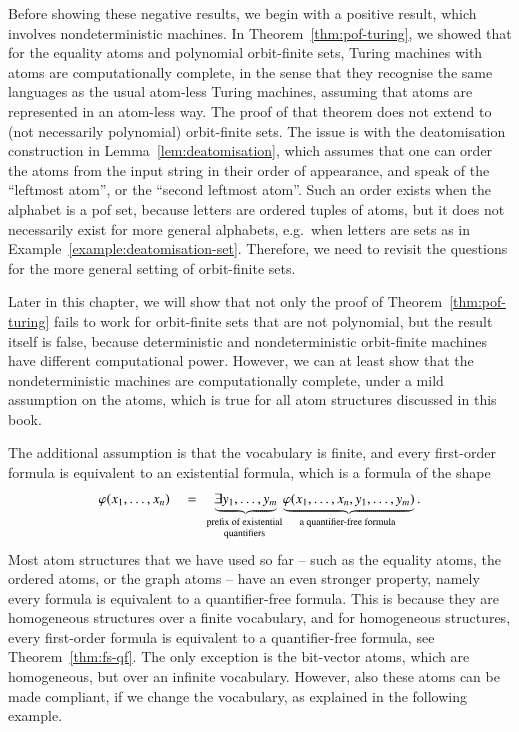Before showing these negative results, we begin with a positive result, which involves nondeterministic machines. In Theorem~\ref{thm:pof-turing}, we showed that for the equality atoms and polynomial orbit-finite sets,  Turing machines with atoms are computationally complete, in the sense that they recognise the same languages as the usual atom-less Turing machines, assuming that atoms are represented in an atom-less way.  
The proof of that theorem  does not extend  to (not necessarily polynomial) orbit-finite sets. The issue is with the deatomisation construction in Lemma~\ref{lem:deatomisation}, which assumes that one can order the atoms from the input string in their order of appearance, and speak of the ``leftmost atom'', or the ``second leftmost atom''. Such an order exists when the alphabet is a pof set, because letters are ordered tuples of atoms, but it does not necessarily exist for more general alphabets,  e.g.~when letters are sets as in Example~\ref{example:deatomisation-set}. 
Therefore, we need to revisit the  questions for the more general setting of orbit-finite sets. 

Later in this chapter, we will show that not only the proof of Theorem~\ref{thm:pof-turing} fails to work for orbit-finite sets that are not polynomial, but the result itself is false, because deterministic and nondeterministic orbit-finite machines have different computational power. However, we can at least show that the nondeterministic machines are computationally complete, under a mild assumption on the atoms, which is true for all atom structures discussed in this book.

The additional assumption is that the vocabulary is finite, and every first-order formula is equivalent to an existential formula, which is a formula of the shape 
\begin{align*}
\varphi(x_1,\ldots,x_n) 
\quad = \quad 
\myunderbrace{\exists y_1,\ldots,y_m}{prefix of existential\\ quantifiers}\  \myunderbrace{\varphi(x_1,\ldots,x_n,y_1,\ldots,y_m)}{a quantifier-free formula}.
\end{align*}
Most atom structures that we have used so far -- such as the equality atoms, the ordered atoms, or the graph atoms -- have an even stronger property, namely every formula is equivalent to a quantifier-free formula. This is because they are homogeneous structures over a finite vocabulary, and for homogeneous structures, every first-order formula is equivalent to a quantifier-free formula, see Theorem~\ref{thm:fs-qf}. The only exception is the bit-vector atoms, which are homogeneous, but over an infinite vocabulary. However, also these atoms can be made compliant, if we change the vocabulary, as explained in the following example. 

